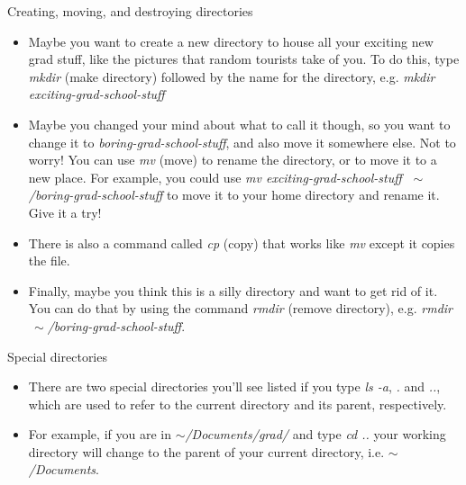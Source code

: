 \documentclass{beamer}
\begin{document}
\begin{frame}{Creating, moving, and destroying directories}
\begin{itemize}
    \item<1-> Maybe you want to create a new directory to house all your exciting new grad stuff, like the pictures that random tourists take of you. To do this, type \emph{mkdir} (make directory) followed by the name for the directory, e.g. \emph{mkdir exciting-grad-school-stuff} 
    \item<2-> Maybe you changed your mind about what to call it though, so you want to change it to \textit{boring-grad-school-stuff}, and also move it somewhere else. Not to worry! You can use \emph{mv} (move) to rename the directory, or to move it to a new place. For example, you could use \emph{mv exciting-grad-school-stuff $\;\sim$/boring-grad-school-stuff} to move it to your home directory and rename it. Give it a try!
    \item<3-> There is also a command called \emph{cp} (copy) that works like \emph{mv} except it copies the file.
    \item<4-> Finally, maybe you think this is a silly directory and want to get rid of it. You can do that by using the command \emph{rmdir} (remove directory), e.g. \emph{rmdir $\,\sim$/boring-grad-school-stuff}.
\end{itemize}
\end{frame}

\begin{frame}{Special directories}
\begin{itemize}
    \item<1-> There are two special directories you'll see listed if you type \emph{ls -a}, \emph{.} and \emph{..}, which are used to refer to the current directory and its parent, respectively.
    \item<2-> For example, if you are in \emph{$\sim$/Documents/grad/} and type \emph{cd ..} your working directory will change to the parent of your current directory, i.e. \emph{$\sim$/Documents}. 
\end{itemize}
\end{frame}
\end{document}
